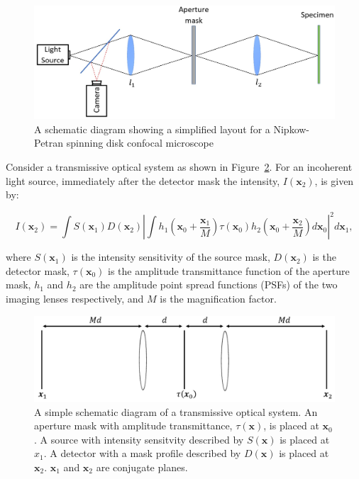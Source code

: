 \begin{figure}[h]
	\centering
	\includegraphics[width=\textwidth]{images/confocal_schematic.jpg}
	\caption[Simplified Nipkow-Petran confocal layout]{A schematic diagram showing a simplified layout for a Nipkow-Petran spinning disk confocal microscope}
	\label{fig:confocal_schematic}
\end{figure}

Consider a transmissive optical system as shown in 
Figure~\ref{fig:optical_system_schematic}. For an incoherent 
light source, immediately after the detector mask the 
intensity, $I\left(\textbf{x}_{2}\right)$, is given by:

\begin{equation}\label{eq:intensity_after_detector}
I\left(\textbf{x}_{2}\right) = \int S\left(\textbf{x}_{1}\right) D\left(\textbf{x}_{2}\right) \left| \int h_{1}\left(\textbf{x}_{0} + \frac{\textbf{x}_{1}}{M}\right) \tau\left(\textbf{x}_{0}\right) h_{2}\left(\textbf{x}_{0} + \frac{\textbf{x}_{2}}{M}\right)d\textbf{x}_{0}\right|^{2}d\textbf{x}_{1},
\end{equation}

where $S\left(\textbf{x}_{1}\right)$ is the intensity 
sensitivity of the source mask, $D\left(\textbf{x}_{2}\right)$ 
is the detector mask, $\tau\left(\textbf{x}_{0}\right)$ is 
the amplitude transmittance function of the aperture mask, 
$h_{1}$ and $h_{2}$ are the amplitude point spread functions 
(PSFs) of the two imaging lenses respectively, and $M$ is the 
magnification factor. 

\begin{figure}[h]
	\centering
	\includegraphics[width=\textwidth]{images/optical_system_schematic.jpg}
	\caption[A simple schematic diagram of a transmissive optical system]{A simple schematic diagram of a transmissive optical system. An aperture mask with amplitude transmittance, $\tau\left(\textbf{x}\right)$, is placed at $\textbf{x}_{0}$. A source with intensity sensitvity described by $S\left(\textbf{x}\right)$ is placed at ${x}_{1}$. A detector with a mask profile described by $D\left(\textbf{x}\right)$ is placed at $\textbf{x}_{2}$. $\textbf{x}_{1}$ and $\textbf{x}_{2}$ are conjugate planes.}
	\label{fig:optical_system_schematic}
\end{figure}

